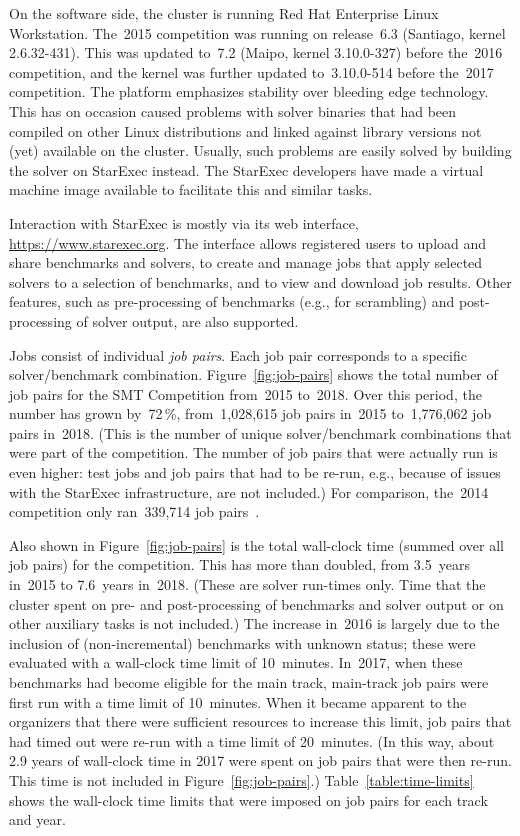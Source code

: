 \documentclass[twoside,11pt]{article}
\begin{document}
On the software side, the cluster is running Red Hat Enterprise Linux
Workstation.  The~2015 competition was running on release~6.3
(Santiago, kernel 2.6.32-431).  This was updated to~7.2 (Maipo, kernel
3.10.0-327) before the~2016 competition, and the kernel was further
updated to~3.10.0-514 before the~2017 competition.  The platform
emphasizes stability over bleeding edge technology.  This has on
occasion caused problems with solver binaries that had been compiled
on other Linux distributions and linked against library versions not
(yet) available on the cluster.  Usually, such problems are easily
solved by building the solver on StarExec instead.  The StarExec
developers have made a virtual machine image available to facilitate
this and similar tasks.

Interaction with StarExec is mostly via its web interface,
\url{https://www.starexec.org}.  The interface allows registered users
to upload and share benchmarks and solvers, to create and manage jobs
that apply selected solvers to a selection of benchmarks, and to view
and download job results.  Other features, such as pre-processing of
benchmarks (e.g., for scrambling) and post-processing of solver
output, are also supported.

Jobs consist of individual \emph{job pairs}.  Each job pair
corresponds to a specific solver/benchmark combination.
Figure~\ref{fig:job-pairs} shows the total number of job pairs for the
SMT Competition from~2015 to~2018.  Over this period, the number has
grown by~72\,\%, from~1,028,615 job pairs in~2015 to~1,776,062 job
pairs in~2018.  (This is the number of unique solver/benchmark
combinations that were part of the competition.  The number of job
pairs that were actually run is even higher: test jobs and job pairs
that had to be re-run, e.g., because of issues with the StarExec
infrastructure, are not included.)  For comparison, the~2014
competition only ran~339,714 job pairs~\cite{CDW14}.

Also shown in Figure~\ref{fig:job-pairs} is the total wall-clock time
(summed over all job pairs) for the competition.  This has more than
doubled, from 3.5~years in~2015 to 7.6~years in~2018.  (These are
solver run-times only.  Time that the cluster spent on pre- and
post-processing of benchmarks and solver output or on other auxiliary
tasks is not included.)  The increase in~2016 is largely due to the
inclusion of (non-incremental) benchmarks with unknown status; these
were evaluated with a wall-clock time limit of 10~minutes.  In~2017,
when these benchmarks had become eligible for the main track,
main-track job pairs were first run with a time limit of 10~minutes.
When it became apparent to the organizers that there were sufficient
resources to increase this limit, job pairs that had timed out were
re-run with a time limit of 20~minutes.  (In this way, about 2.9 years
of wall-clock time in 2017 were spent on job pairs that were then
re-run.  This time is not included in Figure~\ref{fig:job-pairs}.)
Table~\ref{table:time-limits} shows the wall-clock time limits that
were imposed on job pairs for each track and year.
\end{document}
